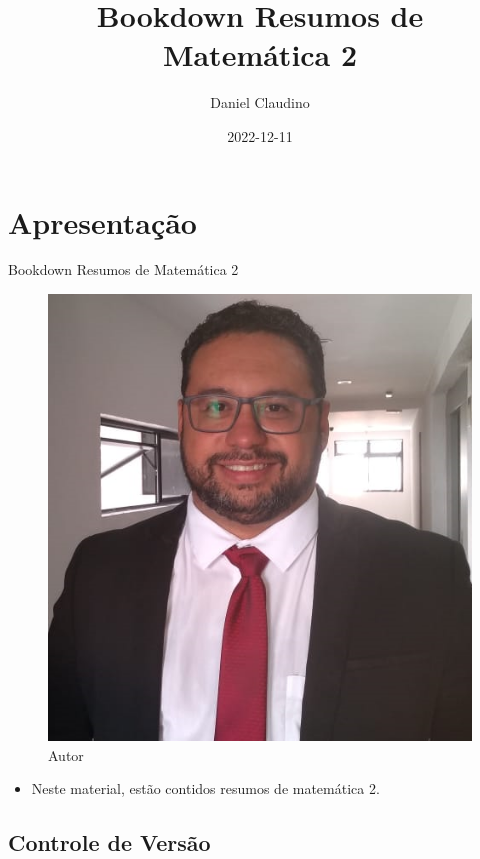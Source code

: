 \documentclass[
]{book}
\title{Bookdown Resumos de Matemática 2}
\author{Daniel Claudino}
\date{2022-12-11}
\providecommand{\tightlist}{%
  \setlength{\itemsep}{0pt}\setlength{\parskip}{0pt}}
\begin{document}
\maketitle

{
\setcounter{tocdepth}{1}
\tableofcontents
}
\hypertarget{apresentauxe7uxe3o}{%
\chapter{Apresentação}\label{apresentauxe7uxe3o}}

Bookdown Resumos de Matemática 2

\begin{figure}

{\centering \includegraphics[width=0.5\linewidth]{imagens/FOTO-PERFIL-DANIEL-CLAUDINO-2020} 

}

\caption{Autor}\label{fig:unnamed-chunk-1}
\end{figure}

\begin{itemize}
\tightlist
\item
  Neste material, estão contidos resumos de matemática 2.
\end{itemize}

\hypertarget{controle-de-versuxe3o}{%
\section{Controle de Versão}\label{controle-de-versuxe3o}}
\end{document}
